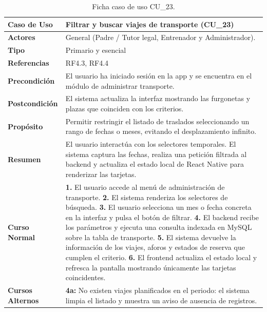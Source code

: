         \begin{table}[htbp]
        \centering
        \scriptsize
        \renewcommand{\arraystretch}{0.78}
        \begin{tabularx}{\textwidth}{|l|X|}
        \hline
        \rowcolor[HTML]{EFEFEF} 
        \textbf{Caso de Uso} & \textbf{Filtrar y buscar viajes de transporte (CU\_23)} \\ \hline
        \textbf{Actores} & General (Padre / Tutor legal, Entrenador y Administrador). \\ \hline
        \textbf{Tipo} & Primario y esencial \\ \hline
        \textbf{Referencias} & RF4.3, RF4.4 \\ \hline
        \textbf{Precondición} & El usuario ha iniciado sesión en la app y se encuentra en el módulo de administrar transporte. \\ \hline
        \textbf{Postcondición} & El sistema actualiza la interfaz mostrando las furgonetas y plazas que coinciden con los criterios. \\ \hline
        \textbf{Propósito} & Permitir restringir el listado de traslados seleccionando un rango de fechas o meses, evitando el desplazamiento infinito. \\ \hline
        \textbf{Resumen} & El usuario interactúa con los selectores temporales. El sistema captura las fechas, realiza una petición filtrada al backend y actualiza el estado local de React Native para renderizar las tarjetas. \\ \hline
        \textbf{Curso Normal} & 
        \textbf{1.} El usuario accede al menú de administración de transporte.\newline
        \textbf{2.} El sistema renderiza los selectores de búsqueda.\newline
        \textbf{3.} El usuario selecciona un mes o fecha concreta en la interfaz y pulsa el botón de filtrar.\newline
        \textbf{4.} El backend recibe los parámetros y ejecuta una consulta indexada en MySQL sobre la tabla de transporte.\newline
        \textbf{5.} El sistema devuelve la información de los viajes, aforos y estados de reserva que cumplen el criterio.\newline
        \textbf{6.} El frontend actualiza el estado local y refresca la pantalla mostrando únicamente las tarjetas coincidentes. \\ \hline
        \textbf{Cursos Alternos} & 
        \textbf{4a:} No existen viajes planificados en el periodo: el sistema limpia el listado y muestra un aviso de ausencia de registros. \\ \hline
        \end{tabularx}
        \caption{Ficha caso de uso CU\_23.}
        \label{tab:cu_23}
        \end{table}
        \newpage

